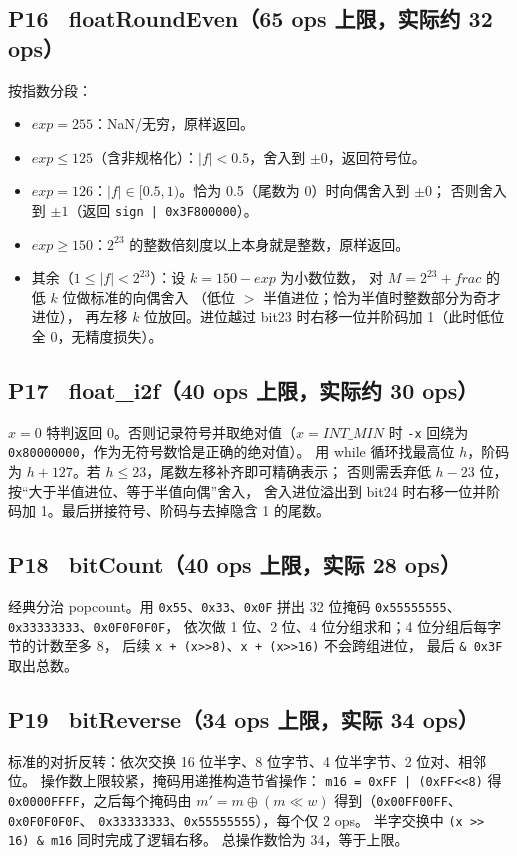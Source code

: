 \documentclass[11pt]{ctexart}
\begin{document}
\subsection{P16 \ floatRoundEven（65 ops 上限，实际约 32 ops）}
按指数分段：
\begin{itemize}
  \item $\mathit{exp}=255$：NaN/无穷，原样返回。
  \item $\mathit{exp}\le 125$（含非规格化）：$|f|<0.5$，舍入到 $\pm 0$，返回符号位。
  \item $\mathit{exp}=126$：$|f|\in[0.5,1)$。恰为 0.5（尾数为 0）时向偶舍入到 $\pm 0$；
    否则舍入到 $\pm 1$（返回 \lstinline!sign | 0x3F800000!）。
  \item $\mathit{exp}\ge 150$：$2^{23}$ 的整数倍刻度以上本身就是整数，原样返回。
  \item 其余（$1\le |f| < 2^{23}$）：设 $k = 150-\mathit{exp}$ 为小数位数，
    对 $M=2^{23}+\mathit{frac}$ 的低 $k$ 位做标准的向偶舍入
    （低位 $>$ 半值进位；恰为半值时整数部分为奇才进位），
    再左移 $k$ 位放回。进位越过 bit23 时右移一位并阶码加 1（此时低位全 0，无精度损失）。
\end{itemize}

\subsection{P17 \ float\_i2f（40 ops 上限，实际约 30 ops）}
$x=0$ 特判返回 0。否则记录符号并取绝对值（$x=\mathit{INT\_MIN}$ 时
\lstinline|-x| 回绕为 \texttt{0x80000000}，作为无符号数恰是正确的绝对值）。
用 while 循环找最高位 $h$，阶码为 $h+127$。若 $h\le 23$，尾数左移补齐即可精确表示；
否则需丢弃低 $h-23$ 位，按``大于半值进位、等于半值向偶''舍入，
舍入进位溢出到 bit24 时右移一位并阶码加 1。最后拼接符号、阶码与去掉隐含 1 的尾数。

\subsection{P18 \ bitCount（40 ops 上限，实际 28 ops）}
经典分治 popcount。用 \texttt{0x55}、\texttt{0x33}、\texttt{0x0F} 拼出
32 位掩码 \texttt{0x55555555}、\texttt{0x33333333}、\texttt{0x0F0F0F0F}，
依次做 1 位、2 位、4 位分组求和；4 位分组后每字节的计数至多 8，
后续 \lstinline|x + (x>>8)|、\lstinline|x + (x>>16)| 不会跨组进位，
最后 \lstinline|& 0x3F| 取出总数。

\subsection{P19 \ bitReverse（34 ops 上限，实际 34 ops）}
标准的对折反转：依次交换 16 位半字、8 位字节、4 位半字节、2 位对、相邻位。
操作数上限较紧，掩码用递推构造节省操作：
\lstinline!m16 = 0xFF | (0xFF<<8)! 得 \texttt{0x0000FFFF}，之后每个掩码由
$m' = m \oplus (m \ll w)$ 得到（\texttt{0x00FF00FF}、\texttt{0x0F0F0F0F}、
\texttt{0x33333333}、\texttt{0x55555555}），每个仅 2 ops。
半字交换中 \lstinline|(x >> 16) & m16| 同时完成了逻辑右移。
总操作数恰为 34，等于上限。
\end{document}

